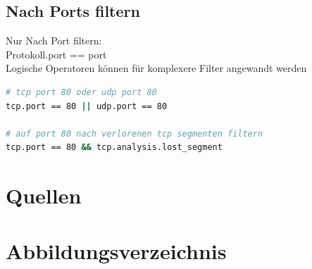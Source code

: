 \documentclass[a4paper]{article}
\begin{document}
\subsection{Nach Ports filtern}
Nur Nach Port filtern:
\\
Protokoll.port == port
\\
Logische Operatoren können für komplexere Filter angewandt werden\cite{Portsfiltern}
\begin{lstlisting}[language=bash,caption={Commands}]
# tcp port 80 oder udp port 80
tcp.port == 80 || udp.port == 80

# auf port 80 nach verlorenen tcp segmenten filtern
tcp.port == 80 && tcp.analysis.lost_segment
\end{lstlisting}

\newpage
\section{Quellen}

\newpage
\section{Abbildungsverzeichnis}

\listoffigures
\end{document}
